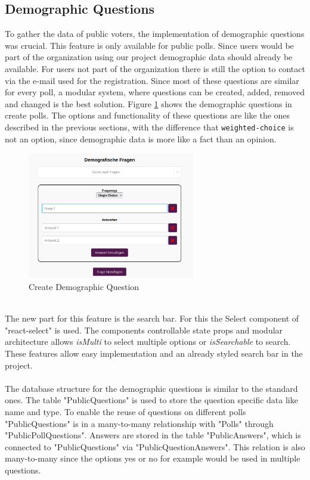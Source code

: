 \documentclass[a4paper,12pt]{report}
\begin{document}
\subsection{Demographic Questions}
To gather the data of public voters, the implementation of demographic questions was crucial. This feature is only available for public polls. Since users would be part of the organization using our project demographic data should already be available. For users not part of the organization there is still the option to contact via the e-mail used for the registration. Since most of these questions are similar for every poll, a modular system, where questions can be created, added, removed and changed is the best solution. Figure \ref{fig:create_dem_que} shows the demographic questions in create polls. The options and functionality of these questions are like the ones described in the previous sections, with the difference that \texttt{weighted-choice} is not an option, since demographic data is more like a fact than an opinion.
\begin{figure}[h!]
	\centering
	\includegraphics[width=0.65\textwidth]{pics/demographic_question_create.jpg}
	\caption{Create Demographic Question}
	\label{fig:create_dem_que}
\end{figure}
\\
The new part for this feature is the search bar. For this the Select component of "react-select" is used. The components controllable state props and modular architecture allows \textit{isMulti} to select multiple options or \textit{isSearchable} to search. These features allow easy implementation and an already styled search bar in the project. \parencite{reactselect}
\\ \\
The database structure for the demographic questions is similar to the standard ones. The table "PublicQuestions" is used to store the question specific data like name and type. To enable the reuse of questions on different polls "PublicQuestions" is in a many-to-many relationship with "Polls" through "PublicPollQuestions". Answers are stored in the table "PublicAnswers", which is connected to "PublicQuestions" via "PublicQuestionAnswers". This relation is also many-to-many since the options yes or no for example would be used in multiple questions. 
\end{document}
